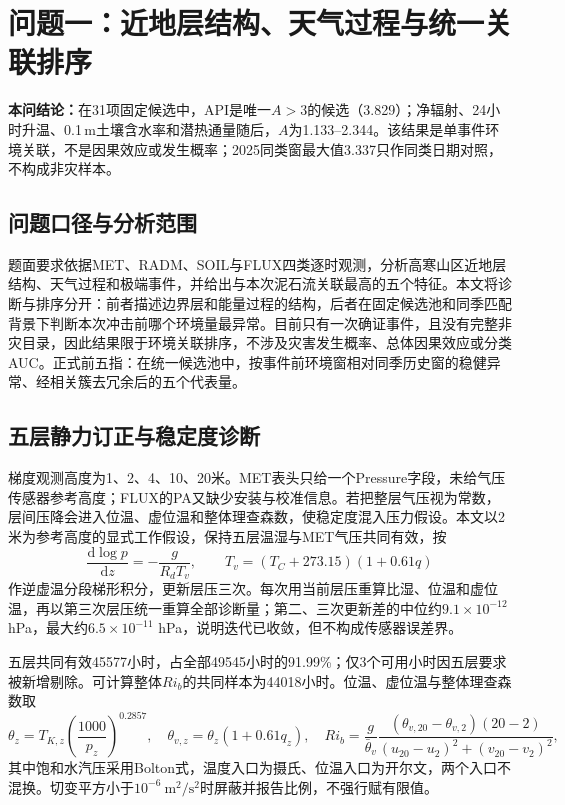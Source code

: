 \section{问题一：近地层结构、天气过程与统一关联排序}
\noindent\textbf{本问结论：}在31项固定候选中，API是唯一$A>3$的候选（3.829）；净辐射、24小时升温、0.1\,m土壤含水率和潜热通量随后，$A$为1.133--2.344。该结果是单事件环境关联，不是因果效应或发生概率；2025同类窗最大值3.337只作同类日期对照，不构成非灾样本。

\subsection{问题口径与分析范围}
题面要求依据MET、RADM、SOIL与FLUX四类逐时观测，分析高寒山区近地层结构、天气过程和极端事件，并给出与本次泥石流关联最高的五个特征。本文将诊断与排序分开：前者描述边界层和能量过程的结构，后者在固定候选池和同季匹配背景下判断本次冲击前哪个环境量最异常。目前只有一次确证事件，且没有完整非灾目录，因此结果限于环境关联排序，不涉及灾害发生概率、总体因果效应或分类AUC。正式前五指：在统一候选池中，按事件前环境窗相对同季历史窗的稳健异常、经相关簇去冗余后的五个代表量。

\subsection{五层静力订正与稳定度诊断}
梯度观测高度为1、2、4、10、20米。MET表头只给一个Pressure字段，未给气压传感器参考高度；FLUX的PA又缺少安装与校准信息。若把整层气压视为常数，层间压降会进入位温、虚位温和整体理查森数，使稳定度混入压力假设。本文以2米为参考高度的显式工作假设，保持五层温湿与MET气压共同有效，按
\begin{equation}
\frac{\mathrm d\log p}{\mathrm dz}=-\frac{g}{R_dT_v},\qquad
T_v=(T_C+273.15)(1+0.61q)
\end{equation}
作逆虚温分段梯形积分，更新层压三次。每次用当前层压重算比湿、位温和虚位温，再以第三次层压统一重算全部诊断量；第二、三次更新差的中位约$9.1\times10^{-12}$ hPa，最大约$6.5\times10^{-11}$ hPa，说明迭代已收敛，但不构成传感器误差界。

五层共同有效45577小时，占全部49545小时的91.99\%；仅3个可用小时因五层要求被新增剔除。可计算整体$Ri_b$的共同样本为44018小时。位温、虚位温与整体理查森数取
\begin{equation}
\theta_z=T_{K,z}\left(\frac{1000}{p_z}\right)^{0.2857},\quad
\theta_{v,z}=\theta_z(1+0.61q_z),\quad
Ri_b=\frac{g}{\bar\theta_v}
\frac{(\theta_{v,20}-\theta_{v,2})(20-2)}
{(u_{20}-u_2)^2+(v_{20}-v_2)^2},
\end{equation}
其中饱和水汽压采用Bolton式，温度入口为摄氏、位温入口为开尔文，两个入口不混换。切变平方小于$10^{-6}\ \mathrm{m^2/s^2}$时屏蔽并报告比例，不强行赋有限值。

